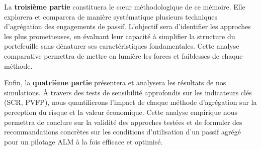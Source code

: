 La \textbf{troisième partie} constituera le cœur méthodologique de ce mémoire. Elle explorera et comparera de manière systématique plusieurs techniques d'agrégation des engagements de passif. L'objectif sera d'identifier les approches les plus prometteuses, en évaluant leur capacité à simplifier la structure du portefeuille sans dénaturer ses caractéristiques fondamentales. Cette analyse comparative permettra de mettre en lumière les forces et faiblesses de chaque méthode.


Enfin, la \textbf{quatrième partie} présentera et analysera les résultats de nos simulations. À travers des tests de sensibilité approfondis sur les indicateurs clés (SCR, PVFP), nous quantifierons l'impact de chaque méthode d'agrégation sur la perception du risque et la valeur économique. Cette analyse empirique nous permettra de conclure sur la validité des approches testées et de formuler des recommandations concrètes sur les conditions d'utilisation d'un passif agrégé pour un pilotage ALM à la fois efficace et optimisé.
